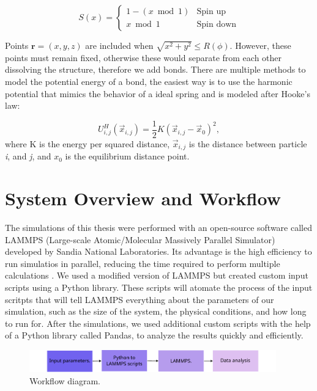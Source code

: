 \begin{equation}
S(x) = \begin{cases}
1 - (x \bmod 1) & \text{Spin up} \\
x \bmod 1 & \text{Spin down}
\end{cases}
\end{equation}

Points $\mathbf{r} = (x, y, z)$ are included when $\sqrt{x^2 + y^2} \leq R(\phi)$.
However, these points must remain fixed, otherwise these would separate from each other dissolving the structure, therefore we add bonds.
There are multiple methods to model the potential energy of a bond, the easiest way is to use the harmonic potential that mimics the behavior of a ideal spring and is modeled after Hooke's law:

\begin{equation}
  U^{H}_{i,j}(\vec{x}_{i,j}) = \frac{1}{2}K(\vec{x}_{i,j} - \vec{x}_0)^2,
\end{equation}
where K is the energy per squared distance, $\vec{x}_{i,j}$ is the distance between particle \textit{i}, and \textit{j}, and $x_0$ is the equilibrium distance point.

\section{System Overview and Workflow}

The simulations of this thesis were performed with an open-source software called LAMMPS (Large-scale Atomic/Molecular Massively Parallel Simulator) developed by Sandia National Laboratories. Its advantage is the high efficiency to run simulatios in parallel, reducing the time required to perform multiple calculations \cite{LAMMPS}. We used a modified version of LAMMPS but created custom input scripts using a Python library. These scripts will atomate the process of the input scritpts that will tell LAMMPS everything about the parameters of our simulation, such as the size of the system, the physical conditions, and how long to run for. After the simulations, we used additional custom scripts with the help of a Python library called Pandas, to analyze the results quickly and efficiently.

\begin{figure}[h]
  \begin{center}
    \includegraphics[width=0.95\textwidth]{figures/workflow.pdf}
  \end{center}
  \caption[Workflow diagram.]{Workflow diagram.}\label{fig:workflow}
\end{figure}

